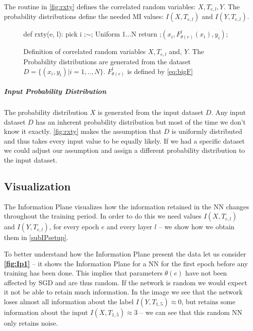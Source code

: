 \documentclass[dissertation.tex]{subfiles}
\begin{document}
The routine in \autoref{fig:rxty} defines the correlated random variables:
$X,T_{e,l},Y$. The probability distributions define the needed MI values:
$I(X, T_{e,l})$ and $I(Y, T_{e,l})$.

\begin{figure}[H]
    \begin{pythonfigure}
      def rxty(e, l):
        pick i ;$\sim$; Uniform {1...N}
        return ;$(x_i, F_{\theta(e)}^l(x_i), y_i)$;
    \end{pythonfigure}
    \caption{
      Definition of correlated random variables $X, T_{e,l}$ and, $Y$. The
      Probability distributions are generated from the dataset $D=\{(x_i,
      y_i)|i=1,..,N\}$. $F_{\theta(e)}^l$ is defined by \autoref{eq:bigF}
    }
    \label{fig:rxty}
\end{figure}

\subparagraph{Input Probability Distribution} The probability distribution $X$
is generated from the input dataset $D$.  Any input dataset $D$ has an inherent
probability distribution but most of the time we don't know it exactly.
\autoref{fig:rxty} makes the assumption that $D$ is uniformly distributed and
thus takes every input value to be equally likely.  If we had a specific dataset
we could adjust our assumption and assign a different probability distribution
to the input dataset.

\subsection{Visualization}

The Information Plane visualizes how the information retained in the NN changes
throughout the training period. 
In order to do this we need values $I(X,T_{e,l})$ and $I(Y,T_{e,l})$, for every
epoch $e$ and every layer $l$ -- we show how we obtain them in
\autoref{subIPsetup}.

To better understand how the Information Plane present the data let us consider
\textbf{\autoref{fig:Ip1}} -- it shows the Information Plane for a NN for the
first epoch before any training has been done. This implies that parameters
$\theta(e)$ have not been affected by SGD and are thus random. If the network is
random we would expect it not be able to retain much information.  In the image
we see that the network loses almost all information about the label $I(Y,
T_{1,5}) \approx 0$, but retains some information about the input $I(X, T_{1,5})
\approx 3$ -- we can see that this random NN only retains noise.
\end{document}

